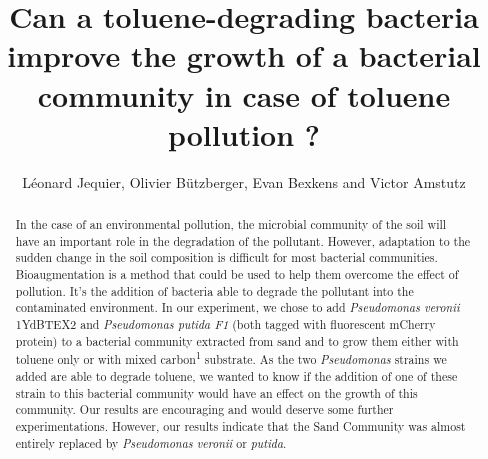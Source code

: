\documentclass[a4paper, 10pt, conference]{ieeeconf}   %
\title{\LARGE \bf
Can a toluene-degrading bacteria improve the growth of a bacterial community in case of toluene pollution ?
}
\author{Léonard Jequier, Olivier Bützberger, Evan Bexkens and Victor Amstutz%
}
\begin{document}
\vspace{-2cm}
\maketitle
\thispagestyle{plain}
\pagestyle{plain}

\begin{abstract}

	

In the case of an environmental pollution, the microbial community of the soil will have an important role in the degradation of the pollutant. However, adaptation to the sudden change in the soil composition is difficult for most bacterial communities. Bioaugmentation is a method that could be used to help them overcome the effect of pollution. It's the addition of bacteria able to degrade the pollutant into the contaminated environment. In our experiment, we chose to add \textit{Pseudomonas veronii} 1YdBTEX2 and \textit{Pseudomonas putida F1} (both tagged with fluorescent mCherry protein) to a bacterial community extracted from sand and to grow them either with toluene only or with mixed carbon\textsuperscript{1} substrate. As the two \textit{Pseudomonas} strains we added are able to degrade toluene, we wanted to know if the addition of one of these strain to this bacterial community would have an effect on the growth of this community.
Our results are encouraging and would deserve some further experimentations. However, our results indicate that the Sand Community was almost entirely replaced by \textit{Pseudomonas veronii} or \textit{putida}.


\end{abstract}
\end{document}
